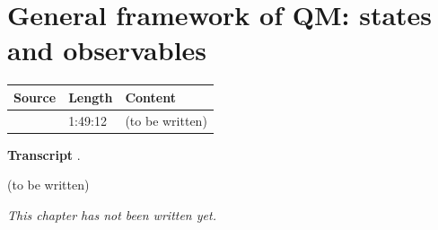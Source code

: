 \chapter{General framework of QM: states and observables}\label{ch:c09}
\begin{paracol}{2}

\begin{sources}
\begin{tabularx}{\linewidth}{@{}l l L@{}}
\toprule
\textbf{Source} & \textbf{Length} & \textbf{Content}\\
\midrule
{} & 1:49:12 & (to be written)\\
\bottomrule
\end{tabularx}

\smallskip
\textbf{Transcript} .
\end{sources}

\begin{reading}
(to be written)
\end{reading}

\emph{This chapter has not been written yet.}

\flushside
\end{paracol}
